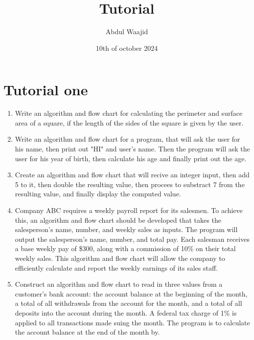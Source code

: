 \documentclass[]{book}
\title{Tutorial}
\author{Abdul Waajid}
\date{10th of october 2024}
\begin{document}
\maketitle
\section{Tutorial one}
\begin{enumerate}
    \item Write an algorithm and flow chart for calculating the perimeter and surface area of a square, if the length of the sides of the square is given by the user.

        

    \item Write an algorithm and flow chart for a program, that will ask the user for his name, then print out "HI" and user's name. Then the program 
        will ask the user for his year of birth, then calculate his age and finally print out the age.

    \item Create an algorithm and flow chart that will recive an integer input, then add 5 to it, then double the resulting value, then procees to substract 7 
        from the resulting value, and finally display the computed value.

    \item  Company ABC requires a weekly payroll report for its salesmen. To achieve this,
        an algorithm and flow chart should be developed that takes the salesperson's
        name, number, and weekly sales as inputs.  The program will output the salesperson's name, number, and total pay. 
        Each salesman receives a base weekly pay of \$300, along with a commission of 10\% on their total 
        weekly sales. This algorithm and flow chart will allow the company to efficiently calculate and report the weekly earnings of its sales staff.

    \item Construct an algorithm and flow chart to read in three values from a customer’s bank account: the account
    balance at the beginning of the month, a total of all withdrawals from the account for the month,
    and a total of all deposits into the account during the month. A federal tax charge of 1\% is
    applied to all transactions made suing the month. The program is to calculate the account
    balance at the end of the month by.


    \begin{enumerate}


\end{enumerate}
\end{enumerate}
\end{document}
